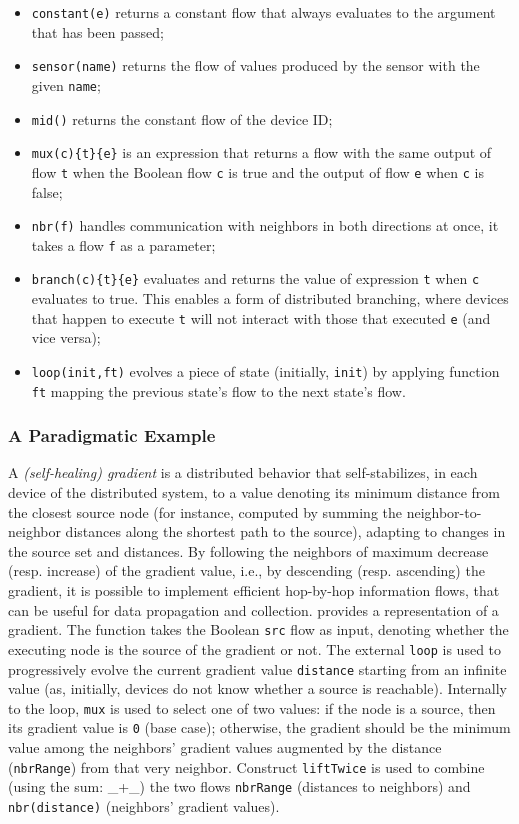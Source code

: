 \begin{itemize}
    \item \texttt{constant(e)} returns a constant flow that always evaluates to the argument that has been passed;
    \item \texttt{sensor(name)} returns the flow of values produced by the sensor with the given \texttt{name};
    \item \texttt{mid()} returns the constant flow of the device ID;
    \item \texttt{mux(c)\{t\}\{e\}} is an expression that returns a flow with the same output of flow \texttt{t} when the Boolean flow \texttt{c} is true and the output of flow \texttt{e} when \texttt{c} is false;
    \item \texttt{nbr(f)} handles communication with neighbors in both directions at once, it takes a flow \texttt{f} as a parameter;
    \item \texttt{branch(c)\{t\}\{e\}} evaluates and returns the value of expression \texttt{t} when \texttt{c} evaluates to true. This enables a form of distributed branching, where devices that happen to execute \texttt{t} will not interact with those that executed \texttt{e} (and vice versa);
    \item \texttt{loop(init,ft)} evolves a piece of state (initially, \texttt{init}) by applying function \texttt{ft} mapping the previous state's flow to the next state's flow.
\end{itemize}

\subsubsection{A Paradigmatic Example}

A \textit{(self-healing) gradient} is a distributed behavior that self-stabilizes, in each device of the distributed system, to a value denoting its minimum distance from the closest source node (for instance, computed by summing the neighbor-to-neighbor distances along the shortest path to the source), adapting to changes in the source set and distances. By following the neighbors of maximum decrease (resp. increase) of the gradient value, i.e., by descending (resp. ascending) the gradient, it is possible to implement efficient hop-by-hop information flows, that can be useful for data propagation and collection.  provides a representation of a gradient. The function takes the Boolean \texttt{src} flow as input, denoting whether the executing node is the source of the gradient or not. The external \texttt{loop} is used to progressively evolve the current gradient value \texttt{distance} starting from an infinite value (as, initially, devices do not know whether a source is reachable). Internally to the loop, \texttt{mux} is used to select one of two values: if the node is a source, then its gradient value is \texttt{0} (base case); otherwise, the gradient should be the minimum value among the neighbors' gradient values augmented by the distance (\texttt{nbrRange}) from that very neighbor. Construct \texttt{liftTwice} is used to combine (using the sum: \_+\_) the two flows \texttt{nbrRange} (distances to neighbors) and \texttt{nbr(distance)} (neighbors' gradient values).

